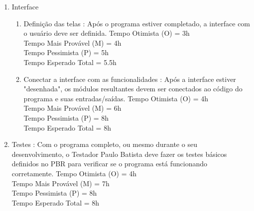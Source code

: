 \documentclass[12pt,a4paper,final]{article}
\begin{document}
\begin{enumerate}
\item Interface
\begin{enumerate}
\item Definição das telas : Após o programa estiver completado, a interface com o usuário deve ser definida.
Tempo Otimista (O) = 3h\\
Tempo Mais Provável (M) = 4h\\
Tempo Pessimista (P) = 5h\\
Tempo Esperado Total = 5.5h
\item Conectar a interface com as funcionalidades : Após a interface estiver "desenhada", os módulos resultantes devem ser conectados ao código do programa e suas entradas/saídas.
Tempo Otimista (O) = 4h\\
Tempo Mais Provável (M) = 6h\\
Tempo Pessimista (P) = 8h\\
Tempo Esperado Total = 8h
\end{enumerate}

\item Testes : Com o programa completo, ou mesmo durante o seu desenvolvimento, o Testador Paulo Batista deve fazer os testes básicos definidos no PBR para verificar se o programa está funcionando corretamente.
Tempo Otimista (O) = 4h\\
Tempo Mais Provável (M) = 7h\\
Tempo Pessimista (P) = 8h\\
Tempo Esperado Total = 8h

\end{enumerate}
\end{document}
